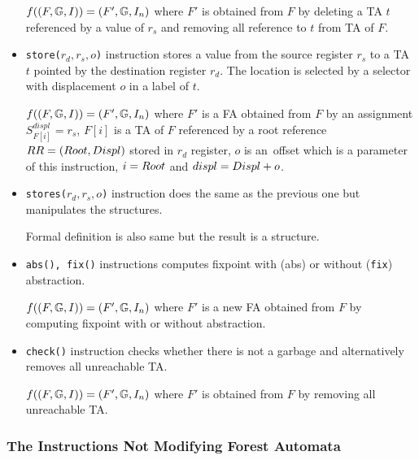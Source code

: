 \begin{itemize}
		$f((F, \mathbb{G}, I)) = (F', \mathbb{G}, I_n)$
		where $F'$ is obtained from $F$ by deleting a TA $t$ referenced
		by a value of $r_s$ and removing all reference to $t$ from TA of $F$.

	\item {\tt store($r_d,r_s,o$)} instruction stores a value from the source register $r_s$
		to a TA $t$ pointed by the destination register $r_d$.
		The location is selected by a selector with displacement $o$ in a label of $t$.
		
		$f((F, \mathbb{G}, I)) = (F', \mathbb{G}, I_n)$
		where $F'$ is a FA obtained from $F$ by an assignment
		$S_{F[i]}^{displ} = r_{s}$,
		$F[i]$ is a TA of $F$ referenced by a root reference $RR=(Root,Displ)$ stored in $r_d$ register,
		$o$ is an~offset which is a parameter of this instruction,
		$i=Root$ and $displ=Displ + o$.
	
	\item {\tt stores($r_d,r_s,o$)} instruction does the same as the previous
		one but manipulates the structures.
		
		Formal definition is also same but the result is a structure.

	\item {\tt abs(), fix()} instructions computes fixpoint with (abs) or
		without ({\tt fix}) abstraction.
		
		$f((F, \mathbb{G}, I)) = (F', \mathbb{G}, I_n)$
		where $F'$ is a new FA obtained from $F$ by computing fixpoint with or without abstraction.

	\item {\tt check()} instruction checks whether there is not a garbage
		and alternatively removes all unreachable TA.
		
		$f((F, \mathbb{G}, I)) = (F', \mathbb{G}, I_n)$
		where $F'$ is obtained from $F$ by removing all unreachable
		TA.

\end{itemize}

\subsubsection{The Instructions Not Modifying Forest Automata}

